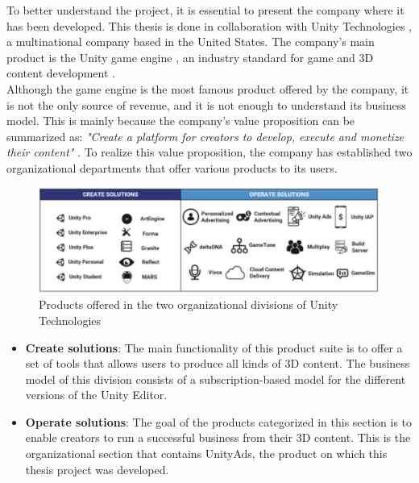 \documentclass[english, 12pt, a4paper, sci, utf8, a-1b, online]{aaltothesis}
\begin{document}
To better understand the project, it is essential to present the company where it has been developed. This thesis is done in collaboration with Unity Technologies \cite{UnityTechnologies}, a multinational company based in the United States. The company's main product is the Unity game engine \cite{haas2014history}, an industry standard for game and 3D content development  \cite{nicoll2019unity}.\\

Although the game engine is the most famous product offered by the company, it is not the only source of revenue, and it is not enough to understand its business model. This is mainly because the company's value proposition can be summarized as: \textit{"Create a platform for creators to develop, execute and monetize their content"} \cite{UnityBusinessModel}. To realize this value proposition, the company has established two organizational departments that offer various products to its users.\\

\begin{figure}[h]
    \centering
    \includegraphics[scale=0.3]{src/thesis/img/background/unity-division.jpg}
    \caption{Products offered in the two organizational divisions of Unity Technologies}
    \label{fig:unity-solutions}
\end{figure}

\begin{itemize}
    \item \textbf{Create solutions}: The main functionality of this product suite is to offer a set of tools that allows users to produce all kinds of 3D content. The business model of this division consists of a subscription-based model for the different versions of the Unity Editor.
    \item \textbf{Operate solutions}: The goal of the products categorized in this section is to enable creators to run a successful business from their 3D content. This is the organizational section that contains UnityAds, the product on which this thesis project was developed.
\end{itemize}
\end{document}
